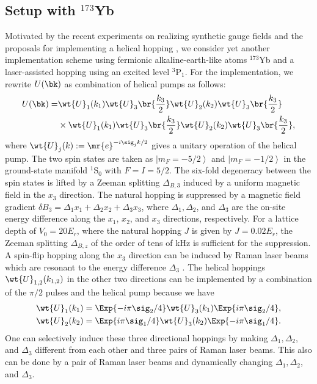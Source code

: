 \documentclass[
floatfix,
pra,
twocolumn,
reprint,
amsmath,amssymb,
aps,
footnote,
]{revtex4}
\begin{document}
\subsection{Setup with ${}^{173}$Yb}
Motivated by the recent experiments on realizing synthetic gauge fields \cite{Mancini15, Song16} and the proposals for implementing a helical hopping \cite{BudichJ15, Budich17}, we consider yet another implementation scheme using fermionic alkaline-earth-like atoms ${}^{173}$Yb and a laser-assisted hopping using an excited level ${}^3$P${}_1$.
For the implementation, we rewrite $U(\bk)$ as combination of helical pumps as follows:
\begin{align}
	U(\bk) =& \wt{U}_1(k_1) \wt{U}_3\br{ {k_3 \over 2}} \wt{U}_2(k_2) \wt{U}_3\br{ {k_3 \over 2}}
	\nonumber \\
	&\times \wt{U}_1(k_1) \wt{U}_3\br{ {k_3 \over 2}} \wt{U}_2(k_2) \wt{U}_3\br{ {k_3 \over 2}}
	,
\end{align}
where $\wt{U}_j(k) := \mr{e}^{- i\sig_j k/2}$ gives a unitary operation of the helical pump.
The two spin states are taken as $\left| m_F = -5/2 \right>$ and $\left| m_F = -1/2 \right>$ in the ground-state manifold ${}^1$S${}_0$ with $F = I = 5/2$.
The six-fold degeneracy between the spin states is lifted  by a Zeeman splitting $\Delta_{B, 3}$ induced by a uniform magnetic field in the $x_3$ direction.
The natural hopping is suppressed by a magnetic field gradient $\delta B_3 = \Delta_1 x_1 + \Delta_2 x_2 + \Delta_3 x_3$, where $\Delta_1, \Delta_2$, and $\Delta_3$ are the on-site energy difference along the $x_1$, $x_2$, and $x_3$ directions, respectively.
For a lattice depth of $V_0  = 20 E_r$, where the natural hopping $J$ is given by $J = 0.02 E_r$, the Zeeman splitting $\Delta_{B,z}$ of the order of tens of kHz is sufficient for the suppression.
A spin-flip hopping along the $x_3$ direction can be induced by Raman laser beams which are resonant to the energy difference $\Delta_3$ \cite{BudichJ15}.
The helical hoppings $\wt{U}_{1,2}(k_{1,2})$ in the other two directions can be implemented by a combination of the $\pi/2$ pulses and the helical pump because we have
\begin{align}
	\wt{U}_1(k_1) =
	\Exp{-i\pi \sig_2/ 4} \wt{U}_3(k_1) \Exp{i\pi \sig_2/ 4}
	, \nonumber \\
	\wt{U}_2(k_2) =
	\Exp{i\pi \sig_1/ 4} \wt{U}_3(k_2) \Exp{-i\pi \sig_1/ 4}
	.
\end{align}
One can selectively induce these three directional hoppings by making $\Delta_1, \Delta_2$, and $\Delta_3$  different from each other and three pairs of Raman laser beams.
This also can be done by a pair of Raman laser beams and dynamically changing $\Delta_1, \Delta_2$, and $\Delta_3$.
\end{document}
